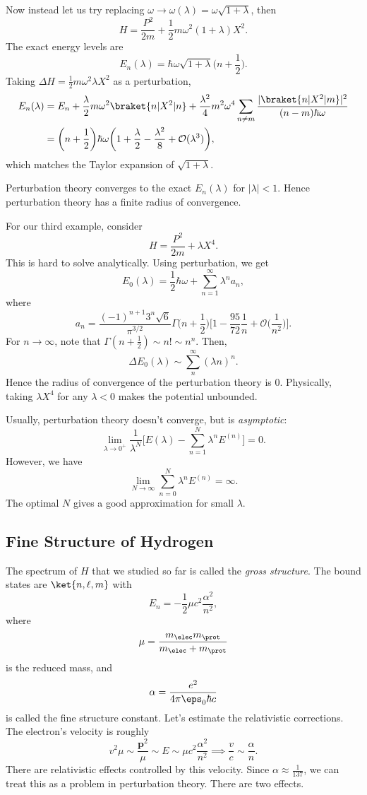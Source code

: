 \documentclass[12pt]{article}
\begin{document}
Now instead let us try replacing $\omega \to \omega(\lambda) = \omega\sqrt{1 + \lambda}$, then
\[
H = \frac{P^2}{2m} + \frac{1}{2} m \omega^2(1+\lambda)X^2.
\]
The exact energy levels are
\[
	E_n(\lambda) = \hbar \omega \sqrt{1 + \lambda} \biggl(n + \frac{1}{2} \biggr).
\]
Taking $\Delta H = \frac{1}{2} m \omega^2 \lambda X^2$ as a perturbation,
\begin{align*}
	E_n(\lambda) &= E_n + \frac{\lambda}{2} m \omega^2 \braket{n|X^2|n} + \frac{\lambda^2}{4} m^2 \omega^{4} \sum_{n \neq m} \frac{|\braket{n|X^2|m}|^2}{(n-m)\hbar \omega} \\
		     &= \biggl(n + \frac{1}{2} \biggr) \hbar \omega \biggl(1 + \frac{\lambda}{2} - \frac{\lambda^2}{8} + \mathcal{O}(\lambda^3) \biggr),
\end{align*}
which matches the Taylor expansion of $\sqrt{1 + \lambda}$.


Perturbation theory converges to the exact $E_n(\lambda)$ for $|\lambda| < 1$. Hence perturbation theory has a finite radius of convergence.

For our third example, consider
\[
H = \frac{P^2}{2m} + \lambda X^4.
\]
This is hard to solve analytically. Using perturbation, we get
\[
E_0(\lambda) = \frac{1}{2} \hbar \omega + \sum_{n = 1}^{\infty} \lambda^n a_n,
\]
where
\[
	a_n = \frac{(-1)^{n+1} 3^n \sqrt 6}{\pi^{3/2}} \Gamma\biggl(n + \frac12\biggr) \biggl[1 - \frac{95}{72} \frac{1}{n} + \mathcal{O}\biggl(\frac{1}{n^2}\biggr)\biggr].
\]
For $n \to \infty$, note that $\Gamma(n + \frac12) \sim n! \sim n^n$. Then,
\[
\Delta E_0(\lambda) \sim \sum_{n}^{\infty} (\lambda n)^n.
\]
Hence the radius of convergence of the perturbation theory is $0$. Physically, taking $\lambda X^4$ for any $\lambda < 0$ makes the potential unbounded.

Usually, perturbation theory doesn't converge, but is \emph{asymptotic}:
\[
	\lim_{\lambda \to 0^+} \frac{1}{\lambda^N} \biggl[E(\lambda) - \sum_{n = 1}^{N} \lambda^n E^{(n)} \biggr] = 0.
\]
However, we have
\[
\lim_{N \to \infty} \sum_{n = 0}^{N} \lambda^n E^{(n)} = \infty.
\]
The optimal $N$ gives a good approximation for small $\lambda$.

\subsection{Fine Structure of Hydrogen}
\label{sub:fine_h}

The spectrum of $H$ that we studied so far is called the \emph{gross structure}. The bound states are $\ket{n, \ell, m}$ with
\[
E_n = - \frac{1}{2} \mu c^2 \frac{\alpha^2}{n^2},
\]
where
\[
\mu = \frac{m_\elec m_\prot}{m_\elec + m_\prot}
\]
is the reduced mass, and
\[
\alpha = \frac{e^2}{4 \pi \eps_0 \hbar c}
\]
is called the fine structure constant. Let's estimate the relativistic corrections. The electron's velocity is roughly
\[
v^2 \mu \sim \frac{\mathbf{p}^2}{\mu} \sim E \sim \mu c^2 \frac{\alpha^2}{n^2} \implies \frac{v}{c} \sim \frac{\alpha}{n}.
\]
There are relativistic effects controlled by this velocity. Since $\alpha \approx \frac1{137}$, we can treat this as a problem in perturbation theory. There are two effects.
\end{document}
